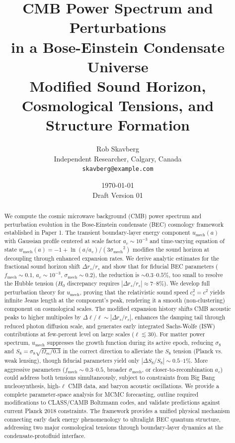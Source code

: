 \documentclass[11pt,a4paper]{article}
\title{\textbf{CMB Power Spectrum and Perturbations\\in a Bose-Einstein Condensate Universe}\\[0.5em]
\large Modified Sound Horizon, Cosmological Tensions, and Structure Formation}
\author{Rob Skavberg\\[0.3em]
\small Independent Researcher, Calgary, Canada\\
\small \texttt{skavberg@example.com}}
\date{\today\\[0.5em]
\small Draft Version 01}
\newcommand{\umech}{\ensuremath{u_{\mathrm{mech}}}}
\newcommand{\wmech}{\ensuremath{w_{\mathrm{mech}}}}
\newcommand{\fmech}{\ensuremath{f_{\mathrm{mech}}}}
\newcommand{\ac}{\ensuremath{a_c}}
\newcommand{\sigmamech}{\ensuremath{\sigma_{\mathrm{mech}}}}
\newcommand{\rs}{\ensuremath{r_s}}
\newcommand{\Omm}{\ensuremath{\Omega_m}}
\theoremstyle{definition}
\theoremstyle{remark}
\begin{document}
\maketitle

\begin{abstract}
We compute the cosmic microwave background (CMB) power spectrum and perturbation evolution in the Bose-Einstein condensate (BEC) cosmology framework established in Paper 1. The transient boundary-layer energy component $\umech(a)$ with Gaussian profile centered at scale factor $\ac \sim 10^{-3}$ and time-varying equation of state $\wmech(a) = -1 + \ln(a/\ac)/(3\sigmamech^2)$ modifies the sound horizon at decoupling through enhanced expansion rates. We derive analytic estimates for the fractional sound horizon shift $\Delta\rs/\rs$ and show that for fiducial BEC parameters ($\fmech \sim 0.1$, $\ac \sim 10^{-3}$, $\sigmamech \sim 0.2$), the reduction is $\sim 0.3$--$0.5\%$, too small to resolve the Hubble tension ($H_0$ discrepancy requires $|\Delta\rs/\rs| \approx 7$--$8\%$). We develop full perturbation theory for $\umech$, proving that the relativistic sound speed $c_s^2 = c^2$ yields infinite Jeans length at the component's peak, rendering it a smooth (non-clustering) component on cosmological scales. The modified expansion history shifts CMB acoustic peaks to higher multipoles by $\Delta\ell/\ell \sim |\Delta\rs/\rs|$, enhances the damping tail through reduced photon diffusion scale, and generates early integrated Sachs-Wolfe (ISW) contributions at few-percent level on large scales ($\ell \lesssim 30$). For matter power spectrum, $\umech$ suppresses the growth function during its active epoch, reducing $\sigma_8$ and $S_8 = \sigma_8\sqrt{\Omm/0.3}$ in the correct direction to alleviate the $S_8$ tension (Planck vs. weak lensing), though fiducial parameters yield only $|\Delta S_8/S_8| \sim 0.5$--$1\%$. More aggressive parameters ($\fmech \sim 0.3$--$0.5$, broader $\sigmamech$, or closer-to-recombination $\ac$) could address both tensions simultaneously, subject to constraints from Big Bang nucleosynthesis, high-$\ell$ CMB data, and baryon acoustic oscillations. We provide a complete parameter-space analysis for MCMC forecasting, outline required modifications to CLASS/CAMB Boltzmann codes, and validate predictions against current Planck 2018 constraints. The framework provides a unified physical mechanism connecting early dark energy phenomenology to ultralight BEC quantum structure, addressing two major cosmological tensions through boundary-layer dynamics at the condensate-protofluid interface.
\end{abstract}
\end{document}
